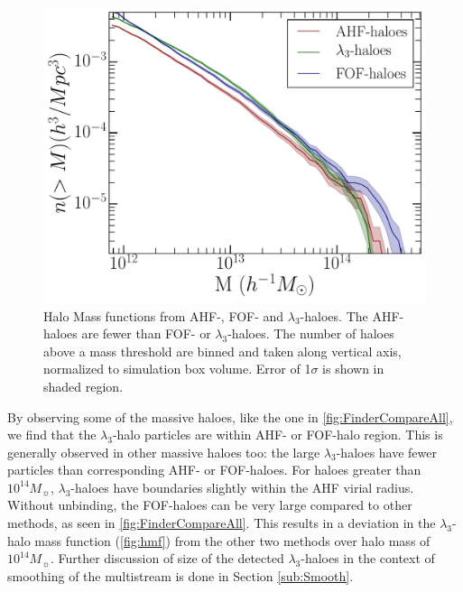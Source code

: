 \documentclass[fleqn,usenatbib,useAMS]{mnras}
\begin{document}
\begin{figure}
\begin{minipage}[t]{.99\linewidth}
 \centering\includegraphics[width=8.cm]{fig10.pdf} 
\end{minipage}\hfill
\caption{Halo Mass functions from AHF-, FOF- and $\lambda_3$-haloes. The AHF-haloes are fewer than FOF- or $\lambda_3$-haloes. The number of haloes above a mass threshold are binned and taken along vertical axis, normalized to simulation box volume. Error of 1$\sigma$ is shown in shaded region. }
\label{fig:hmf}
\end{figure}


By observing some of the massive haloes, like the one in \autoref{fig:FinderCompareAll}, we find that the $\lambda_3$-halo particles are within AHF- or FOF-halo region. This is generally observed in other massive haloes too: the large $\lambda_3$-haloes have fewer particles than corresponding AHF- or FOF-haloes. For haloes greater than $10^{14} M_{\sun}$, $\lambda_3$-haloes have boundaries slightly within the AHF virial radius. Without unbinding, the FOF-haloes can be very large compared to other methods, as seen in \autoref{fig:FinderCompareAll}. This results in a deviation in the $\lambda_3$-halo mass function (\autoref{fig:hmf}) from the other two methods over halo mass of $10^{14} M_{\sun}$. Further discussion of size of the detected $\lambda_3$-haloes in the context of smoothing of the multistream is done in Section \ref{sub:Smooth}.   
\end{document}
